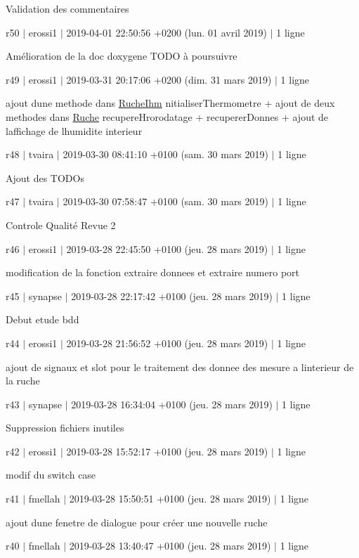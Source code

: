 Validation des commentaires

r50 $\vert$ erossi1 $\vert$ 2019-\/04-\/01 22\+:50\+:56 +0200 (lun. 01 avril 2019) $\vert$ 1 ligne

Amélioration de la doc doxygene T\+O\+DO à poursuivre

r49 $\vert$ erossi1 $\vert$ 2019-\/03-\/31 20\+:17\+:06 +0200 (dim. 31 mars 2019) $\vert$ 1 ligne

ajout d\textquotesingle{}une methode dans \hyperlink{class_ruche_ihm}{Ruche\+Ihm} nitialiser\+Thermometre + ajout de deux methodes dans \hyperlink{class_ruche}{Ruche} recupere\+Hrorodatage + recuperer\+Donnes + ajout de l\textquotesingle{}affichage de l\textquotesingle{}humidite interieur

r48 $\vert$ tvaira $\vert$ 2019-\/03-\/30 08\+:41\+:10 +0100 (sam. 30 mars 2019) $\vert$ 1 ligne

Ajout des T\+O\+D\+Os

r47 $\vert$ tvaira $\vert$ 2019-\/03-\/30 07\+:58\+:47 +0100 (sam. 30 mars 2019) $\vert$ 1 ligne

Controle Qualité Revue 2

r46 $\vert$ erossi1 $\vert$ 2019-\/03-\/28 22\+:45\+:50 +0100 (jeu. 28 mars 2019) $\vert$ 1 ligne

modification de la fonction extraire donnees et extraire numero port

r45 $\vert$ synapse $\vert$ 2019-\/03-\/28 22\+:17\+:42 +0100 (jeu. 28 mars 2019) $\vert$ 1 ligne

Debut etude bdd

r44 $\vert$ erossi1 $\vert$ 2019-\/03-\/28 21\+:56\+:52 +0100 (jeu. 28 mars 2019) $\vert$ 1 ligne

ajout de signaux et slot pour le traitement des donnee des mesure a l\textquotesingle{}interieur de la ruche

r43 $\vert$ synapse $\vert$ 2019-\/03-\/28 16\+:34\+:04 +0100 (jeu. 28 mars 2019) $\vert$ 1 ligne

Suppression fichiers inutiles

r42 $\vert$ erossi1 $\vert$ 2019-\/03-\/28 15\+:52\+:17 +0100 (jeu. 28 mars 2019) $\vert$ 1 ligne

modif du switch case

r41 $\vert$ fmellah $\vert$ 2019-\/03-\/28 15\+:50\+:51 +0100 (jeu. 28 mars 2019) $\vert$ 1 ligne

ajout d\textquotesingle{}une fenetre de dialogue pour créer une nouvelle ruche

r40 $\vert$ fmellah $\vert$ 2019-\/03-\/28 13\+:40\+:47 +0100 (jeu. 28 mars 2019) $\vert$ 1 ligne

